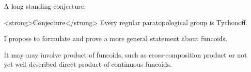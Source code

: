 \documentclass[12pt]{article}
\begin{document}
A long standing conjecture:

<strong>Conjecture</strong> Every regular paratopological group is Tychonoff.

I propose to formulate and prove a more general statement about funcoids.

It may may involve product of funcoids, such as cross-composition product or not yet well described direct product of continuous funcoids. 
\end{document}
